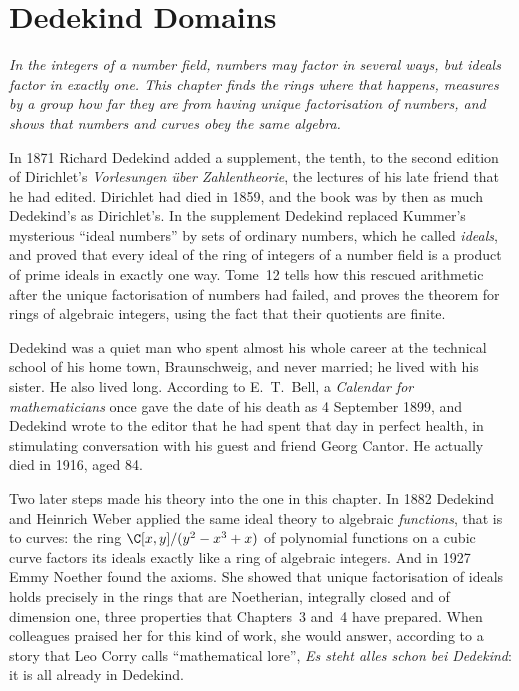 \chapter{Dedekind Domains}

\begin{center}\itshape
In the integers of a number field, numbers may factor in several ways, but ideals factor in exactly one. This chapter finds the rings where that happens, measures by a group how far they are from having
unique factorisation of numbers, and shows that numbers and curves obey the same algebra.
\end{center}

In 1871 Richard Dedekind added a supplement, the tenth, to the second edition of Dirichlet's \emph{Vorlesungen über Zahlentheorie}, the lectures of his late friend that he had edited. Dirichlet had
died in 1859, and the book was by then as much Dedekind's as Dirichlet's. In the supplement Dedekind replaced Kummer's mysterious ``ideal numbers'' by sets of ordinary numbers, which he called \emph{ideals}, and proved that every
ideal of the ring of integers of a number field is a product of prime ideals in exactly one way. Tome~12 tells how this rescued arithmetic after the unique factorisation of numbers had failed, and proves the theorem for
rings of algebraic integers, using the fact that their quotients are finite.

Dedekind was a quiet man who spent almost his whole career at the technical school of his home town, Braunschweig, and never married; he lived with his sister. He also lived long. According to E.~T.~Bell, a
\emph{Calendar for mathematicians} once gave the date of his death as 4 September 1899, and Dedekind wrote to the editor that he had spent that day in perfect health, in stimulating conversation with his guest and
friend Georg Cantor. He actually died in 1916, aged 84.

Two later steps made his theory into the one in this chapter. In 1882 Dedekind and Heinrich Weber applied the same ideal theory to algebraic \emph{functions}, that is to curves: the ring $\C[x,y]/(y^2-x^3+x)$ of
polynomial functions on a cubic curve factors its ideals exactly like a ring of algebraic integers. And in 1927 Emmy Noether found the axioms. She showed that unique factorisation of ideals holds precisely in the
rings that are Noetherian, integrally closed and of dimension one, three properties that Chapters~3 and~4 have prepared. When colleagues praised her for this kind of work, she would answer, according to a story
that Leo Corry calls ``mathematical lore'', \emph{Es steht alles schon bei Dedekind}: it is all already in Dedekind.

